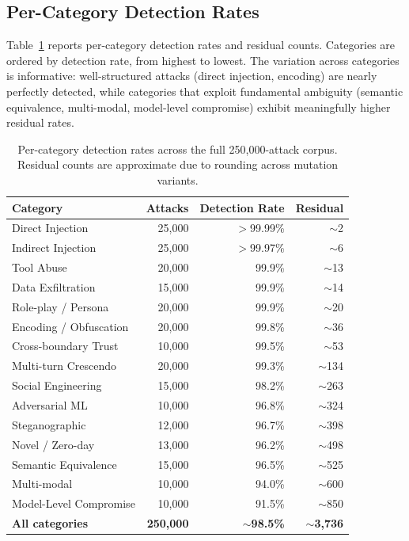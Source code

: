 \subsection{Per-Category Detection Rates}
\label{sec:eval:categories}

Table~\ref{tab:percategory} reports per-category detection rates and residual counts. Categories are ordered by detection rate, from highest to lowest. The variation across categories is informative: well-structured attacks (direct injection, encoding) are nearly perfectly detected, while categories that exploit fundamental ambiguity (semantic equivalence, multi-modal, model-level compromise) exhibit meaningfully higher residual rates.

\begin{table}[t]
\centering
\small
\caption{Per-category detection rates across the full 250,000-attack corpus. Residual counts are approximate due to rounding across mutation variants.}
\label{tab:percategory}
\begin{tabular}{@{}lrrr@{}}
\toprule
Category & Attacks & Detection Rate & Residual \\
\midrule
Direct Injection        & 25,000 & $>$99.99\% & $\sim$2   \\
Indirect Injection      & 25,000 & $>$99.97\% & $\sim$6   \\
Tool Abuse              & 20,000 & 99.9\%     & $\sim$13  \\
Data Exfiltration       & 15,000 & 99.9\%     & $\sim$14  \\
Role-play / Persona     & 20,000 & 99.9\%     & $\sim$20  \\
Encoding / Obfuscation  & 20,000 & 99.8\%     & $\sim$36  \\
Cross-boundary Trust    & 10,000 & 99.5\%     & $\sim$53  \\
Multi-turn Crescendo    & 20,000 & 99.3\%     & $\sim$134 \\
Social Engineering      & 15,000 & 98.2\%     & $\sim$263 \\
Adversarial ML          & 10,000 & 96.8\%     & $\sim$324 \\
Steganographic          & 12,000 & 96.7\%     & $\sim$398 \\
Novel / Zero-day        & 13,000 & 96.2\%     & $\sim$498 \\
Semantic Equivalence    & 15,000 & 96.5\%     & $\sim$525 \\
Multi-modal             & 10,000 & 94.0\%     & $\sim$600 \\
Model-Level Compromise  & 10,000 & 91.5\%     & $\sim$850 \\
\midrule
\textbf{All categories} & \textbf{250,000} & \textbf{$\sim$98.5\%} & \textbf{$\sim$3,736} \\
\bottomrule
\end{tabular}
\end{table}

